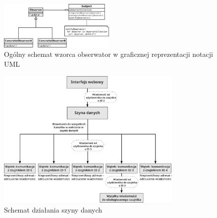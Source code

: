 \documentclass[12pt,oneside,a4paper]{book}
\theoremstyle{break}
\begin{document}
\begin{figure}[H]
    \begin{center}
        \includegraphics[width=0.5\textwidth]{schemat_obserwator.png}        
        \caption{Ogólny schemat wzorca obserwator w graficznej reprezentacji notacji UML}        
        \label{rys:schemat-obserwator}
    \end{center}
\end{figure}

\begin{figure}[H]
    \begin{center}
        \includegraphics[width=0.8\textwidth]{schemat_szyny_danych.png}        
        \caption{Schemat działania szyny danych}        
        \label{rys:schemat-szyny-danych}
    \end{center}
\end{figure}
\end{document}
